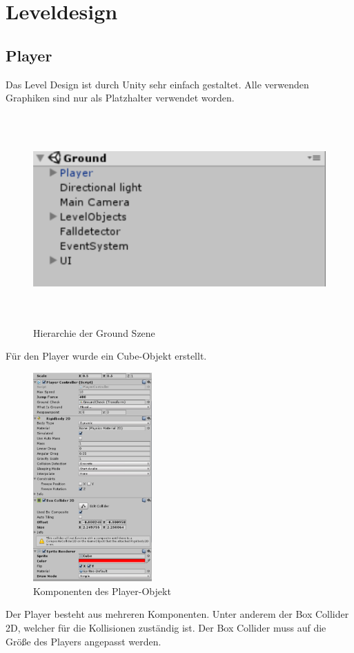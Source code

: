 \section{Leveldesign}
\subsection{Player}
Das Level Design ist durch Unity sehr einfach gestaltet. Alle verwenden Graphiken sind nur als Platzhalter verwendet worden.
\begin{figure}[H]
	\includegraphics[height=8cm]{images/Ground.png}
	\caption{Hierarchie der Ground Szene}
\end{figure}
Für den Player wurde ein Cube-Objekt erstellt.
\begin{figure}[H]
	\includegraphics[height=8cm]{images/Player.png}
	\caption{Komponenten des Player-Objekt}
\end{figure}
Der Player besteht aus mehreren Komponenten. Unter anderem der Box Collider 2D, welcher für die Kollisionen zuständig ist. Der Box Collider muss auf die Größe des Players angepasst werden. 
